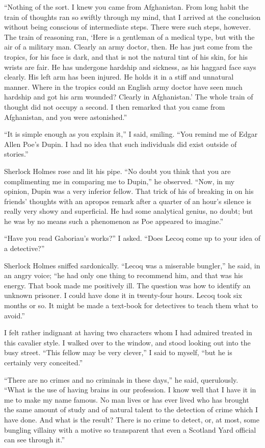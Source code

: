 \documentclass[12pt]{book}
\begin{document}
“Nothing of the sort. I knew you came from Afghanistan. From long habit the train of thoughts ran so swiftly through my mind, that I arrived at the conclusion without being conscious of intermediate steps. There were such steps, however. The train of reasoning ran, ‘Here is a gentleman of a medical type, but with the air of a military man. Clearly an army doctor, then. He has just come from the tropics, for his face is dark, and that is not the natural tint of his skin, for his wrists are fair. He has undergone hardship and sickness, as his haggard face says clearly. His left arm has been injured. He holds it in a stiff and unnatural manner. Where in the tropics could an English army doctor have seen much hardship and got his arm wounded? Clearly in Afghanistan.’ The whole train of thought did not occupy a second. I then remarked that you came from Afghanistan, and you were astonished.” 

“It is simple enough as you explain it,” I said, smiling. “You remind me of Edgar Allen Poe’s Dupin. I had no idea that such individuals did exist outside of stories.” 

Sherlock Holmes rose and lit his pipe. “No doubt you think that you are complimenting me in comparing me to Dupin,” he observed. “Now, in my opinion, Dupin was a very inferior fellow. That trick of his of breaking in on his friends’ thoughts with an apropos remark after a quarter of an hour’s silence is really very showy and superficial. He had some analytical genius, no doubt; but he was by no means such a phenomenon as Poe appeared to imagine.” 

“Have you read Gaboriau’s works?” I asked. “Does Lecoq come up to your idea of a detective?” 

Sherlock Holmes sniffed sardonically. “Lecoq was a miserable bungler,” he said, in an angry voice; “he had only one thing to recommend him, and that was his energy. That book made me positively ill. The question was how to identify an unknown prisoner. I could have done it in twenty-four hours. Lecoq took six months or so. It might be made a text-book for detectives to teach them what to avoid.” 

I felt rather indignant at having two characters whom I had admired treated in this cavalier style. I walked over to the window, and stood looking out into the busy street. “This fellow may be very clever,” I said to myself, “but he is certainly very conceited.” 

“There are no crimes and no criminals in these days,” he said, querulously. “What is the use of having brains in our profession. I know well that I have it in me to make my name famous. No man lives or has ever lived who has brought the same amount of study and of natural talent to the detection of crime which I have done. And what is the result? There is no crime to detect, or, at most, some bungling villainy with a motive so transparent that even a Scotland Yard official can see through it.” 
\end{document}
